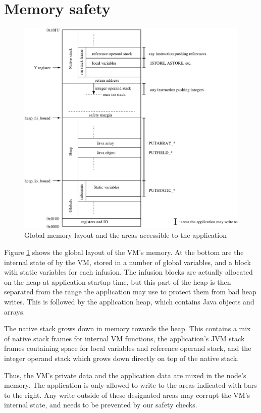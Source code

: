 \section{Memory safety}
\begin{figure}[]
  \includegraphics[width=\linewidth]{memlayout.eps}
  \caption{Global memory layout and the areas accessible to the application}
  \label{fig-memlayout}
\end{figure}

Figure \ref{fig-memlayout} shows the global layout of the VM's memory. At the bottom are the internal state of by the VM, stored in a number of global variables, and a block with static variables for each infusion. The infusion blocks are actually allocated on the heap at application startup time, but this part of the heap is then separated from the range the application may use to protect them from bad heap writes. This is followed by the application heap, which contains Java objects and arrays.

The native stack grows down in memory towards the heap. This contains a mix of native stack frames for internal VM functions, the application's JVM stack frames containing space for local variables and reference operand stack, and the integer operand stack which grows down directly on top of the native stack.

Thus, the VM's private data and the application data are mixed in the node's memory. The application is only allowed to write to the areas indicated with bars to the right. Any write outside of these designated areas may corrupt the VM's internal state, and needs to be prevented by our safety checks.

